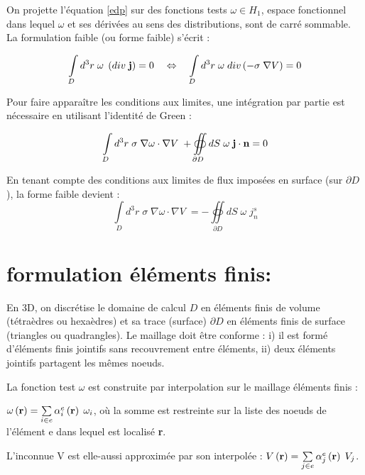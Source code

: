 \documentclass[a4paper, 11pt]{article}
\begin{document}
On projette l'équation \eqref{edp} sur des fonctions tests $\omega \in H_1$, espace
fonctionnel dans lequel $\omega$ et ses dérivées au sens des distributions, sont
de carré sommable. La formulation faible (ou forme faible) s’écrit :

\begin{equation}
\int\limits_D {{d^3}r\;{\omega}\;} \left( {div\;{\bf{j}}} \right) = 0\quad  \Leftrightarrow \quad \int\limits_D {{d^3}r\;{\omega}\;} div\left( { - \sigma \;\nabla V} \right) = 0
\end{equation}

Pour faire apparaître les conditions aux limites, une intégration par partie est nécessaire en utilisant l’identité de Green :

\begin{equation}
\int\limits_D {{d^3}r\;\sigma \;\nabla {\omega} \cdot \nabla V\;}  + \oiint\limits_{\partial D} 
 {dS\;} {\omega}\;{\bf{j}} \cdot {\bf{n}} = 0
\end{equation}

En tenant compte des conditions aux limites de flux imposées en surface (sur $\partial D$), la forme faible devient :
\begin{equation}
\int\limits_D {{d^3}r\;\sigma \;\nabla {\omega} \cdot \nabla V\;}  =  - \oiint\limits_{\partial D} 
 {dS\;} {\omega}\;j_n^s
\label{weak}
\end{equation}

\section{formulation éléments finis:}

En 3D, on discrétise le domaine de calcul $D$ en éléments finis de volume (tétraèdres ou hexaèdres) et sa trace 
(surface) $\partial D$ en éléments finis de surface (triangles ou quadrangles). Le maillage 
doit être conforme : i) il est formé d'éléments finis jointifs sans recouvrement entre éléments,
ii) deux éléments jointifs partagent les mêmes noeuds. 

La fonction test $\omega$ est construite par interpolation sur le maillage éléments finis :

$\omega\left( {\bf{r}} \right) = \sum\limits_{i\in e} {{\alpha _i^e}\left( {\bf{r}} \right)\;{\omega_i}} $,
où la somme est restreinte sur la liste des noeuds de l'élément e dans lequel est localisé {\bf{r}}.

L’inconnue V est elle-aussi approximée par son interpolée  :
$V\left( {\bf{r}} \right) = \sum\limits_{j\in e} {{\alpha _j^e}\left( {\bf{r}} \right)\;{V_j}} $.
\end{document}

